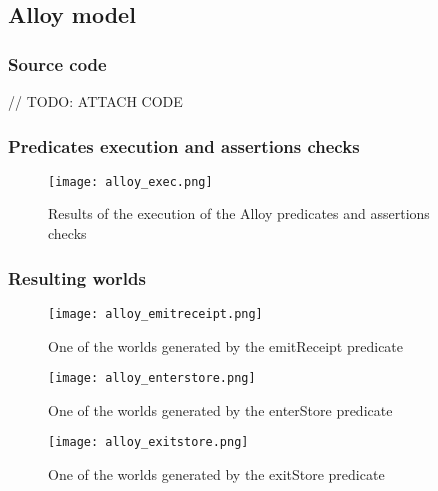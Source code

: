 \documentclass[../../main.tex]{subfiles}
\begin{document}
\subsection{Alloy model}

\subsubsection{Source code}

// TODO: ATTACH CODE

\subsubsection{Predicates execution and assertions checks}

\begin{figure}[H]
  \centering
  \texttt{[image: alloy\_exec.png]}
  \caption{Results of the execution of the Alloy predicates and assertions checks}
\end{figure}

\subsubsection{Resulting worlds}

\begin{figure}[H]
  \centering
  \texttt{[image: alloy\_emitreceipt.png]}
  \caption{One of the worlds generated by the emitReceipt predicate}
\end{figure}

\begin{figure}[H]
  \centering
  \texttt{[image: alloy\_enterstore.png]}
  \caption{One of the worlds generated by the enterStore predicate}
\end{figure}

\begin{figure}[H]
  \centering
  \texttt{[image: alloy\_exitstore.png]}
  \caption{One of the worlds generated by the exitStore predicate}
\end{figure}
\end{document}
